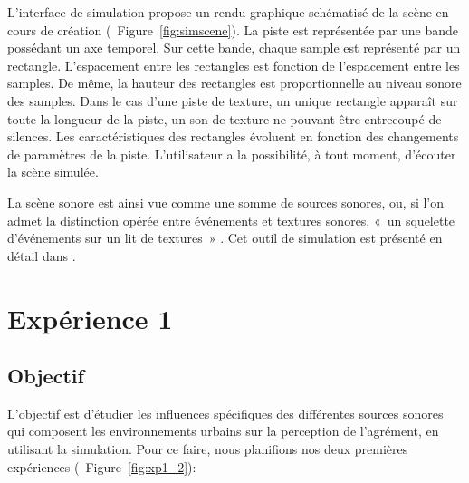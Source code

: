 \documentclass[twoside,twocolumn]{article}
\begin{document}
L'interface de simulation propose un rendu graphique schématisé de la scène en cours de création (\cf~Figure~\ref{fig:simscene}). La piste est représentée par une bande possédant un axe temporel. Sur cette bande, chaque sample est représenté par un rectangle. L'espacement entre les rectangles est fonction de l'espacement entre les samples. De même, la hauteur des rectangles est proportionnelle au niveau sonore des samples. Dans le cas d'une piste de texture, un unique rectangle apparaît sur toute la longueur de la piste, un son de texture ne pouvant être entrecoupé de silences. Les caractéristiques des rectangles évoluent en fonction des changements de paramètres de la piste. L'utilisateur a la possibilité, à tout moment, d'écouter la scène simulée.

La scène sonore est ainsi vue comme une somme de sources sonores, ou, si l'on admet la distinction opérée entre événements et textures sonores, «~un squelette d'événements sur un lit de textures~» \cite{nelken2013ear}. Cet outil de simulation est présenté en détail dans \cite{rossignol2015simscene}.


\section{Expérience 1}
\label{sec:xp1}

\subsection{Objectif}

L'objectif est d'étudier les influences spécifiques des différentes sources sonores qui composent les environnements urbains sur la perception de l'agrément, en utilisant la simulation. Pour ce faire, nous planifions nos deux premières expériences (\cf~Figure~\ref{fig:xp1_2}):
\end{document}
